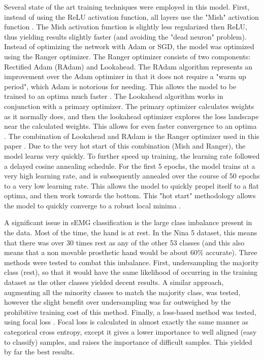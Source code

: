 Several state of the art training techniques were employed in this model. First, instead of using the ReLU activation function, all layers use the "Mish" activation function \cite{mish}. The Mish activation function is slightly less regularized then ReLU, thus yielding results slightly faster (and avoiding the "dead neuron" problem). Instead of optimizing the network with Adam or SGD, the model was optimized using the Ranger optimizer. The Ranger optimizer consists of two components: Rectified Adam (RAdam) and Lookahead. The RAdam algorithm represents an improvement over the Adam optimizer in that it does not require a "warm up period", which Adam is notorious for needing. This allows the model to be trained to an optima much faster \cite{radam}. The Lookahead algorithm works in conjunction with a primary optimizer. The primary optimizer calculates weights as it normally does, and then the lookahead optimizer explores the loss landscape near the calculated weights. This allows for even faster convergence to an optima \cite{ranger2}. The combination of Lookahead and RAdam is the Ranger optimizer used in this paper \cite{ranger1}. Due to the very hot start of this combination (Mish and Ranger), the model learns very quickly. To further speed up training, the learning rate followed a delayed cosine annealing schedule. For the first 5 epochs, the model trains at a very high learning rate, and is subsequently annealed over the course of 50 epochs to a very low learning rate. This allows the model to quickly propel itself to a flat optima, and then work towards the bottom. This "hot start" methodology allows the model to quickly converge to a robust local minima \cite{break}.

A significant issue in sEMG classification is the large class imbalance present in the data. Most of the time, the hand is at rest. In the Nina 5 dataset, this means that there was over 30 times rest as any of the other 53 classes (and this also means that a non movable prosthetic hand would be about 60\% accurate). Three methods were tested to combat this imbalance. First, undersampling the majority class (rest), so that it would have the same likelihood of occurring in the training dataset as the other classes yielded decent results. A similar approach, augmenting all the minority classes to match the majority class, was tested, however the slight benefit over undersampling was far outweighed by the prohibitive training cost of this method. Finally, a loss-based method was tested, using focal loss \cite{focal}. Focal loss is calculated in almost exactly the same manner as categorical cross entropy, except it gives a lower importance to well aligned (easy to classify) samples, and raises the importance of difficult samples. This yielded by far the best results. 
